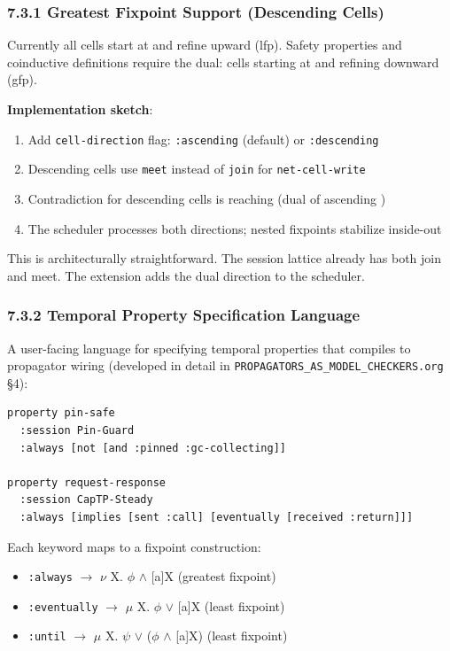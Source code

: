 \documentclass[11pt]{article}
\begin{document}
\subsubsection{7.3.1 Greatest Fixpoint Support (Descending Cells)}
\label{sec:org269bcfb}

Currently all cells start at \bot and refine upward (lfp). Safety properties
and coinductive definitions require the dual: cells starting at \top and
refining downward (gfp).

\textbf{Implementation sketch}:
\begin{enumerate}
\item Add \texttt{cell-direction} flag: \texttt{:ascending} (default) or \texttt{:descending}
\item Descending cells use \texttt{meet} instead of \texttt{join} for \texttt{net-cell-write}
\item Contradiction for descending cells is reaching \bot (dual of ascending \top)
\item The scheduler processes both directions; nested fixpoints stabilize
inside-out
\end{enumerate}

This is architecturally straightforward. The session lattice already has both
join and meet. The extension adds the dual direction to the scheduler.
\subsubsection{7.3.2 Temporal Property Specification Language}
\label{sec:org25444a1}

A user-facing language for specifying temporal properties that compiles to
propagator wiring (developed in detail in \texttt{PROPAGATORS\_AS\_MODEL\_CHECKERS.org}
§4):

\begin{verbatim}
property pin-safe
  :session Pin-Guard
  :always [not [and :pinned :gc-collecting]]

property request-response
  :session CapTP-Steady
  :always [implies [sent :call] [eventually [received :return]]]
\end{verbatim}

Each keyword maps to a fixpoint construction:
\begin{itemize}
\item \texttt{:always} \(\to\) \(\nu\) X. \(\phi\) \(\land\) {[}a]X (greatest fixpoint)
\item \texttt{:eventually} \(\to\) \(\mu\) X. \(\phi\) \(\lor\) {[}a]X (least fixpoint)
\item \texttt{:until} \(\to\) \(\mu\) X. \(\psi\) \(\lor\) (\(\phi\) \(\land\) {[}a]X) (least fixpoint)
\end{itemize}
\end{document}
